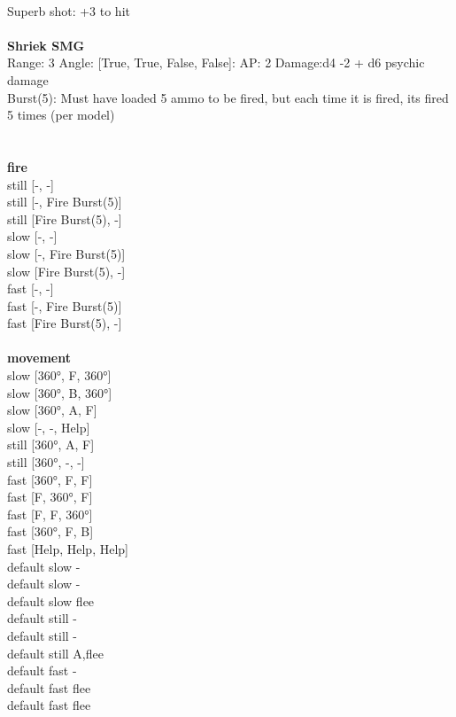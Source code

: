 \ \\
Superb shot: +3 to hit\\ 

\ \\
{\bf Shriek SMG } \\



Range: 3  Angle: [True, True, False, False]: AP: 2 Damage:d4 -2 + d6 psychic damage \\
Burst(5): Must have loaded 5 ammo to be fired, but each time it is fired, its fired 5 times (per model)\\ 




 
\ \\



\ \\ {\bf fire } \\
still [-, -] \\
still [-, Fire Burst(5)] \\
still [Fire Burst(5), -] \\
slow [-, -] \\
slow [-, Fire Burst(5)] \\
slow [Fire Burst(5), -] \\
fast [-, -] \\
fast [-, Fire Burst(5)] \\
fast [Fire Burst(5), -] \\
\ \\ {\bf movement } \\
slow [360°, F, 360°] \\
slow [360°, B, 360°] \\
slow [360°, A, F] \\
slow [-, -, Help] \\
still [360°, A, F] \\
still [360°, -, -] \\
fast [360°, F, F] \\
fast [F, 360°, F] \\
fast [F, F, 360°] \\
fast [360°, F, B] \\
fast [Help, Help, Help] \\
default slow - \\
default slow - \\
default slow flee \\
default still - \\
default still - \\
default still A,flee \\
default fast - \\
default fast flee \\
default fast flee \\


